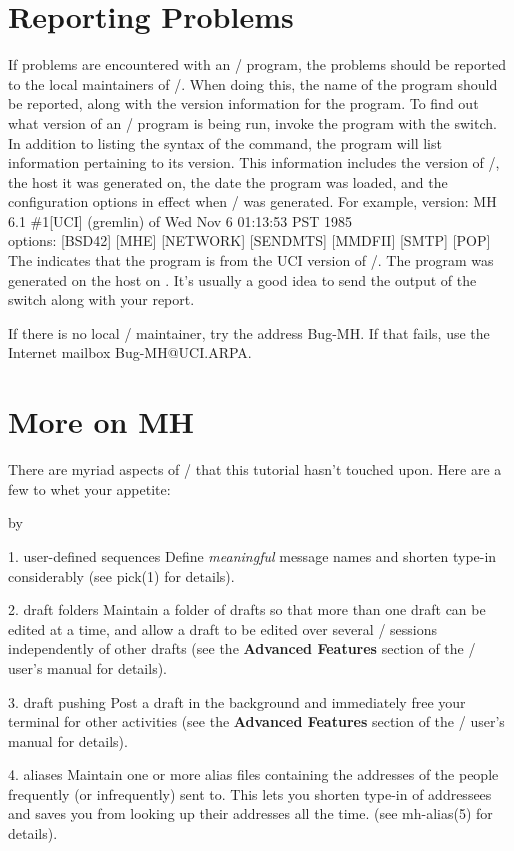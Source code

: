 \section{Reporting Problems}
If problems are encountered with an \MH/ program,
the problems should be reported to the local maintainers of \MH/.
When doing this,
the name of the program should be reported,
along with the version information for the program.
To find out what version of an \MH/ program is being run,
invoke the program with the  switch.
In addition to listing the syntax of the command,
the program will list information pertaining to its version.
This information includes the version of \MH/,
the host it was generated on,
the date the program was loaded,
and the configuration options in effect when \MH/ was generated.
For example,
\example
    version: MH 6.1 \#1[UCI] (gremlin) of Wed Nov  6 01:13:53 PST 1985\\
    options: [BSD42] [MHE] [NETWORK] [SENDMTS] [MMDFII] [SMTP] [POP]\endexample
The  indicates that the program is from the UCI 
version of \MH/.
The program was generated on the host  on
.
It's usually a good idea to send the output of the  switch along
with your report.

If there is no local \MH/ maintainer,
try the address {\tx Bug-MH}.
If that fails, use the Internet mailbox {\tx Bug-MH@UCI.ARPA}.

\section{More on MH}
There are myriad aspects of \MH/ that this tutorial hasn't touched upon.
Here are a few to whet your appetite:
\smallskip
{\advance\leftskip by\parindent
\item{1.} user-defined sequences\hbreak
Define {\it meaningful} message names and shorten type-in considerably
(see \man pick(1) for details).

\item{2.} draft folders\hbreak
Maintain a folder of drafts so that more than one draft can be edited at a
time,
and allow a draft to be edited over several \unix/ sessions independently of
other drafts
(see the {\bf Advanced Features} section of the \MH/ user's manual for
details).

\item{3.} draft pushing\hbreak
Post a draft in the background
and immediately free your terminal for other activities
(see the {\bf Advanced Features} section of the \MH/ user's manual for
details).

\item{4.} aliases\hbreak
Maintain one or more alias files containing the addresses of the people
frequently (or infrequently) sent to.
This lets you shorten type-in of addressees
and saves you from looking up
their addresses all the time.
(see \man mh-alias(5) for details).
\smallskip}
